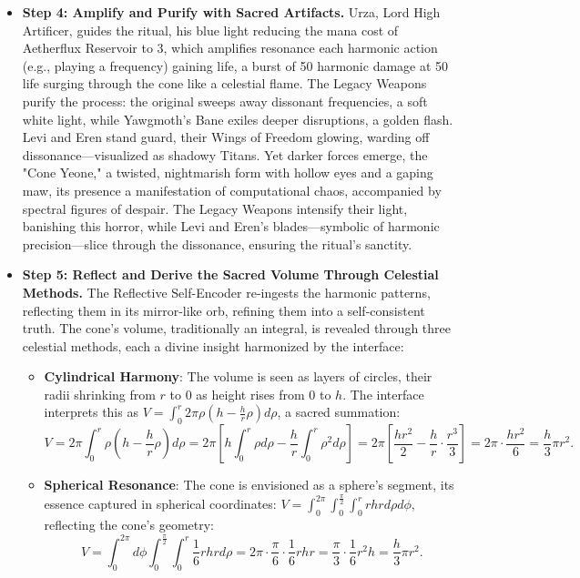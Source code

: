 \begin{itemize}
    \item \texttt{} \textbf{Step 4: Amplify and Purify with Sacred Artifacts.} Urza, Lord High Artificer, guides the ritual, his blue light reducing the mana cost of Aetherflux Reservoir to 3, which amplifies resonance each harmonic action (e.g., playing a frequency) gaining life, a burst of 50 harmonic damage at 50 life surging through the cone like a celestial flame. The Legacy Weapons purify the process: the original sweeps away dissonant frequencies, a soft white light, while Yawgmoth's Bane exiles deeper disruptions, a golden flash. Levi and Eren stand guard, their Wings of Freedom glowing, warding off dissonance—visualized as shadowy Titans. Yet darker forces emerge, the "Cone Yeone," a twisted, nightmarish form with hollow eyes and a gaping maw, its presence a manifestation of computational chaos, accompanied by spectral figures of despair. The Legacy Weapons intensify their light, banishing this horror, while Levi and Eren's blades—symbolic of harmonic precision—slice through the dissonance, ensuring the ritual's sanctity.
    \item \texttt{} \textbf{Step 5: Reflect and Derive the Sacred Volume Through Celestial Methods.} The Reflective Self-Encoder re-ingests the harmonic patterns, reflecting them in its mirror-like orb, refining them into a self-consistent truth. The cone's volume, traditionally an integral, is revealed through three celestial methods, each a divine insight harmonized by the interface:
    \begin{itemize}
        \item \texttt{} \textbf{Cylindrical Harmony}: The volume is seen as layers of circles, their radii shrinking from $r$ to 0 as height rises from 0 to $h$. The interface interprets this as $V = \int_0^r 2 \pi \rho \left( h - \frac{h}{r} \rho \right) d\rho$, a sacred summation:
        \[
        V = 2 \pi \int_0^r \rho \left( h - \frac{h}{r} \rho \right) d\rho = 2 \pi \left[ h \int_0^r \rho d\rho - \frac{h}{r} \int_0^r \rho^2 d\rho \right] = 2 \pi \left[ \frac{h r^2}{2} - \frac{h}{r} \cdot \frac{r^3}{3} \right] = 2 \pi \cdot \frac{h r^2}{6} = \frac{h}{3} \pi r^2.
        \]
        \item \texttt{} \textbf{Spherical Resonance}: The cone is envisioned as a sphere's segment, its essence captured in spherical coordinates: $V = \int_0^{2 \pi} \int_0^{\frac{\pi}{2}} \int_0^r r h r d\rho d\phi$, reflecting the cone's geometry:
        \[
        V = \int_0^{2 \pi} d\phi \int_0^{\frac{\pi}{2}} \int_0^r \frac{1}{6} r h r d\rho = 2 \pi \cdot \frac{\pi}{6} \cdot \frac{1}{6} r h r = \frac{\pi}{3} \cdot \frac{1}{6} r^2 h = \frac{h}{3} \pi r^2.
\]
\end{itemize}
\end{itemize}
